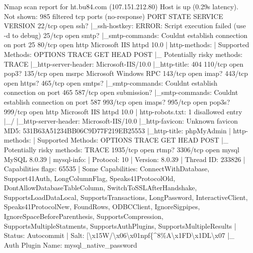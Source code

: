 \documentclass[
]{article}
\newenvironment{Shaded}{}{}
\newcommand{\NormalTok}[1]{#1}
\begin{document}
\begin{Shaded}
\begin{Highlighting}[]
\NormalTok{Nmap scan report for ht.bu84.com (107.151.212.80)}
\NormalTok{Host is up (0.29s latency).}
\NormalTok{Not shown: 985 filtered tcp ports (no{-}response)}
\NormalTok{PORT     STATE SERVICE     VERSION}
\NormalTok{22/tcp   open  ssh?}
\NormalTok{|\_ssh{-}hostkey: ERROR: Script execution failed (use {-}d to debug)}
\NormalTok{25/tcp   open  smtp?}
\NormalTok{|\_smtp{-}commands: Couldn\textquotesingle{}t establish connection on port 25}
\NormalTok{80/tcp   open  http        Microsoft IIS httpd 10.0}
\NormalTok{| http{-}methods:}
\NormalTok{|   Supported Methods: OPTIONS TRACE GET HEAD POST}
\NormalTok{|\_  Potentially risky methods: TRACE}
\NormalTok{|\_http{-}server{-}header: Microsoft{-}IIS/10.0}
\NormalTok{|\_http{-}title: 404}
\NormalTok{110/tcp  open  pop3?}
\NormalTok{135/tcp  open  msrpc       Microsoft Windows RPC}
\NormalTok{143/tcp  open  imap?}
\NormalTok{443/tcp  open  https?}
\NormalTok{465/tcp  open  smtps?}
\NormalTok{|\_smtp{-}commands: Couldn\textquotesingle{}t establish connection on port 465}
\NormalTok{587/tcp  open  submission?}
\NormalTok{|\_smtp{-}commands: Couldn\textquotesingle{}t establish connection on port 587}
\NormalTok{993/tcp  open  imaps?}
\NormalTok{995/tcp  open  pop3s?}
\NormalTok{999/tcp  open  http        Microsoft IIS httpd 10.0}
\NormalTok{| http{-}robots.txt: 1 disallowed entry}
\NormalTok{|\_/}
\NormalTok{|\_http{-}server{-}header: Microsoft{-}IIS/10.0}
\NormalTok{|\_http{-}favicon: Unknown favicon MD5: 531B63A51234BB06C9D77F219EB25553}
\NormalTok{|\_http{-}title: phpMyAdmin}
\NormalTok{| http{-}methods:}
\NormalTok{|   Supported Methods: OPTIONS TRACE GET HEAD POST}
\NormalTok{|\_  Potentially risky methods: TRACE}
\NormalTok{1935/tcp open  rtmp?}
\NormalTok{3306/tcp open  mysql       MySQL 8.0.39}
\NormalTok{| mysql{-}info:}
\NormalTok{|   Protocol: 10}
\NormalTok{|   Version: 8.0.39}
\NormalTok{|   Thread ID: 233826}
\NormalTok{|   Capabilities flags: 65535}
\NormalTok{|   Some Capabilities: ConnectWithDatabase, Support41Auth, LongColumnFlag, Speaks41ProtocolOld, DontAllowDatabaseTableColumn, SwitchToSSLAfterHandshake, SupportsLoadDataLocal, SupportsTransactions, LongPassword, InteractiveClient, Speaks41ProtocolNew, FoundRows, ODBCClient, IgnoreSigpipes, IgnoreSpaceBeforeParenthesis, SupportsCompression, SupportsMultipleStatments, SupportsAuthPlugins, SupportsMultipleResults}
\NormalTok{|   Status: Autocommit}
\NormalTok{|   Salt: [\textasciigrave{}\textbackslash{}x15W/\textbackslash{}x06\textbackslash{}x01npf\{\^{}8\%A\textbackslash{}x1FD\textbackslash{}x1DL\textbackslash{}x07}
\NormalTok{|\_  Auth Plugin Name: mysql\_native\_password}

\end{Highlighting}
\end{Shaded}
\end{document}
